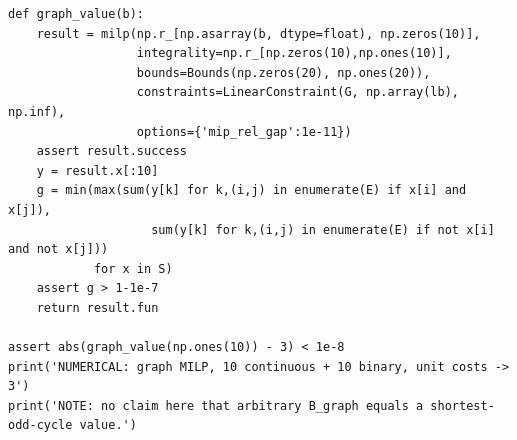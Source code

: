 \documentclass[11pt,a4paper]{ctexart}
\theoremstyle{definition}
\begin{document}
\begin{lstlisting}[caption={Finite certificate vertex and graph MILP audit}]
def graph_value(b):
    result = milp(np.r_[np.asarray(b, dtype=float), np.zeros(10)],
                  integrality=np.r_[np.zeros(10),np.ones(10)],
                  bounds=Bounds(np.zeros(20), np.ones(20)),
                  constraints=LinearConstraint(G, np.array(lb), np.inf),
                  options={'mip_rel_gap':1e-11})
    assert result.success
    y = result.x[:10]
    g = min(max(sum(y[k] for k,(i,j) in enumerate(E) if x[i] and x[j]),
                    sum(y[k] for k,(i,j) in enumerate(E) if not x[i] and not x[j]))
            for x in S)
    assert g > 1-1e-7
    return result.fun

assert abs(graph_value(np.ones(10)) - 3) < 1e-8
print('NUMERICAL: graph MILP, 10 continuous + 10 binary, unit costs -> 3')
print('NOTE: no claim here that arbitrary B_graph equals a shortest-odd-cycle value.')
\end{lstlisting}
\end{document}
